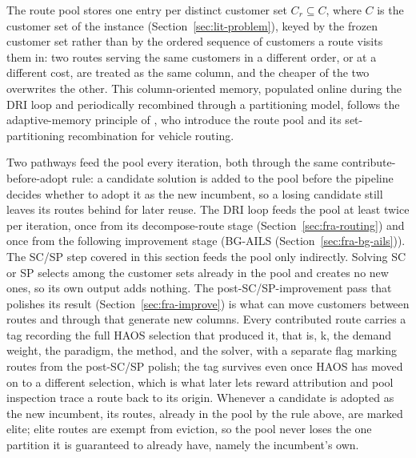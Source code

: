 The route pool stores one entry per distinct customer set $C_r \subseteq C$, where $C$ is the customer set of the instance (Section~\ref{sec:lit-problem}), keyed by the frozen customer set rather than by the ordered sequence of customers a route visits them in: two routes serving the same customers in a different order, or at a different cost, are treated as the same column, and the cheaper of the two overwrites the other. This column-oriented memory, populated online during the DRI loop and periodically recombined through a partitioning model, follows the adaptive-memory principle of \citet{rochatProbabilisticDiversificationIntensification1995}, who introduce the route pool and its set-partitioning recombination for vehicle routing.

Two pathways feed the pool every iteration, both through the same contribute-before-adopt rule: a candidate solution is added to the pool before the pipeline decides whether to adopt it as the new incumbent, so a losing candidate still leaves its routes behind for later reuse. The DRI loop feeds the pool at least twice per iteration, once from its decompose-route stage (Section~\ref{sec:fra-routing}) and once from the following improvement stage (BG-AILS (Section~\ref{sec:fra-bg-ails})). The SC/SP step covered in this section feeds the pool only indirectly. Solving SC or SP selects among the customer sets already in the pool and creates no new ones, so its own output adds nothing. The post-SC/SP-improvement pass that polishes its result (Section~\ref{sec:fra-improve}) is what can move customers between routes and through that generate new columns. Every contributed route carries a tag recording the full HAOS selection that produced it, that is, k, the demand weight, the paradigm, the method, and the solver, with a separate flag marking routes from the post-SC/SP polish; the tag survives even once HAOS has moved on to a different selection, which is what later lets reward attribution and pool inspection trace a route back to its origin. Whenever a candidate is adopted as the new incumbent, its routes, already in the pool by the rule above, are marked elite; elite routes are exempt from eviction, so the pool never loses the one partition it is guaranteed to already have, namely the incumbent's own.

